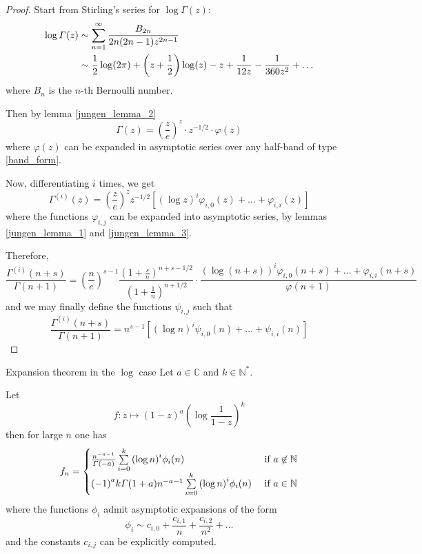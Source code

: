 \documentclass[../main.tex]{subfiles}
\begin{document}
\begin{proof}
	Start from Stirling's series for $\log \Gamma(z)$:
	\begin{align*}
	\log \Gamma(z) &\sim \sum\limits_{n=1}^\infty \frac{B_{2n}}{2n(2n-1)z^{2n-1}}\\
	&\sim \frac{1}{2} \log(2\pi) + \left(z + \frac{1}{2}\right) \log (z) - z + \frac{1}{12z} - \frac{1}{360z^2} + \dots
	\end{align*}
	where $B_n$ is the $n$-th Bernoulli number.
	
	Then by lemma \ref{jungen_lemma_2}
	\[
	\Gamma(z) = {\left(\frac{z}{e}\right)}^z \cdot z^{-1/2} \cdot \varphi(z)
	\]
	where $\varphi(z)$ can be expanded in asymptotic series over any half-band of type \eqref{band_form}.
	
	Now, differentiating $i$ times, we get
	\begin{equation*}
	\Gamma^{(i)}(z) = {\left(\frac{z}{e}\right)}^z z^{-1/2}
	\left[{(\log z)}^i \varphi_{i,0}(z) + \dots + \varphi_{i,i}(z) \right]
	\end{equation*}
	where the functions $\varphi_{i,j}$ can be expanded into asymptotic series, by lemmas \ref{jungen_lemma_1} and \ref{jungen_lemma_3}.
	
	Therefore,
	\begin{equation*}
	\frac{\Gamma^{(i)}(n+s)}{\Gamma(n + 1)} =
	{\left(\frac{n}{e}\right)}^{s - 1} \frac{{\left(1 + \frac{s}{n}\right)}^{n + s - 1/2}}{{\left(1 + \frac{1}{n}\right)}^{n + 1/2}}
	\cdot \frac{{(\log(n + s))}^i \varphi_{i,0}(n+s) + \dots + \varphi_{i,i}(n+s)}{\varphi(n + 1)}
	\end{equation*}
	and we may finally define the functions $\psi_{i, j}$ such that
	\[
	\frac{\Gamma^{(i)}(n+s)}{\Gamma(n + 1)} = n^{s-1} [{(\log n)}^i \psi_{i, 0}(n) + \dots + \psi_{i, i}(n)]
	\]
\end{proof}

\begin{thm}{Expansion theorem in the $\log$ case}\label{thm_expansion_log}
	Let $a \in \mathbb{C}$ and $k \in \mathbb{N}^*$.
	
	Let
	\[
	f : z \mapsto {(1 - z)}^{a} {\left( \log \frac{1}{1 - z} \right)}^k
	\]
	then for large $n$ one has
	\begin{align*}
	f_n =
	\begin{cases}
	\frac{n^{-a-1}}{\Gamma(-a)} \sum\limits_{i = 0}^k {(\log n)}^i \phi_i(n) &\text{ if $a \not\in \mathbb{N}$}\\
	{(-1)}^a k \Gamma(1 + a) n^{-a - 1} \sum\limits_{i = 0}^k {(\log n)}^i \phi_i(n) &\text{ if $a \in \mathbb{N}$}
	\end{cases}
	\end{align*}
	where the functions $\phi_i$ admit asymptotic expansions of the form
	\[
	\phi_i \sim c_{i, 0} + \frac{c_{i, 1}}{n} + \frac{c_{i, 2}}{n^2} + \dots
	\]
	and the constants $c_{i, j}$ can be explicitly computed.
\end{thm}
\end{document}
